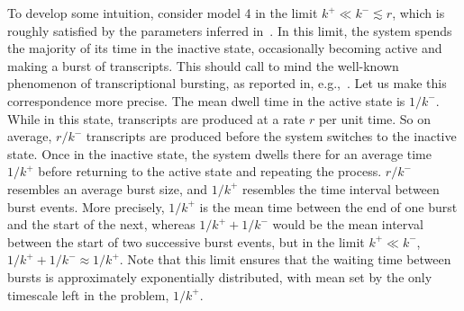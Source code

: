 To develop some intuition, consider model 4 in the limit $k^+ \ll k^- \lesssim
r$, which is roughly satisfied by the parameters inferred
in~\cite{Razo-Mejia2020}. In this limit, the system spends the majority of its
time in the inactive state, occasionally becoming active and making a burst of
transcripts. This should call to mind the well-known phenomenon of
transcriptional bursting, as reported in,
e.g.,~\cite{Golding2005,Chong2014,Sevier2016}.
Let us make this correspondence more precise. The mean dwell
time in the active state is $1/k^-$. While in this state, transcripts are
produced at a rate $r$ per unit time. So on average, $r/k^-$ transcripts are
produced before the system switches to the inactive state. Once in the inactive
state, the system dwells there for an average time $1/k^+$ before returning to
the active state and repeating the process. $r/k^-$ resembles an average burst
size, and $1/k^+$ resembles the time interval between burst events. More
precisely, $1/k^+$ is the mean time between the end of one burst and the start
of the next, whereas $1/k^+ + 1/k^-$ would be the mean interval between the
start of two successive burst events, but in the limit $k^+ \ll k^-$, $1/k^+ +
1/k^- \approx 1/k^+$. Note that this limit ensures that the waiting time between
bursts is approximately exponentially distributed, with mean set by the only
timescale left in the problem, $1/k^+$.

